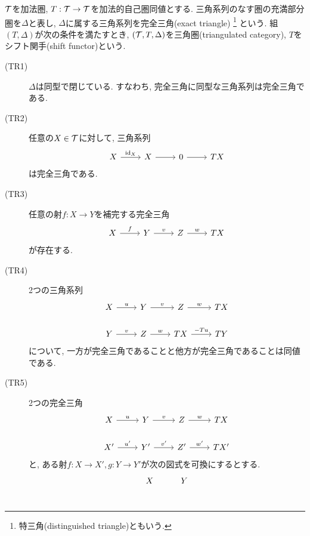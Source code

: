 \documentclass[uplatex, a4paper, 14Q, dvipdfmx]{jsarticle}
\begin{document}
\begin{definition}[三角圏]
  $\mathcal{T}$を加法圏, $T: \mathcal{T} \to \mathcal{T}$を加法的自己圏同値とする. 
  三角系列のなす圏の充満部分圏を$\Delta$と表し, $\Delta$に属する三角系列を完全三角(exact triangle)
  \footnote{
    特三角(distinguished triangle)ともいう. 
  }
  という. 
  組$(T,\Delta)$が次の条件を満たすとき, $(\mathcal{T}, T, \Delta)$を三角圏(triangulated category), $T$をシフト関手(shift functor)という. 
  \begin{description}
    \item[(TR1)] $\Delta$は同型で閉じている. すなわち, 完全三角に同型な三角系列は完全三角である. 
    \item[(TR2)] 任意の$X \in \mathcal{T}$に対して, 三角系列
    \[\begin{tikzcd}
      X & X & 0 & TX
      \arrow["\id_X", from=1-1, to=1-2]
      \arrow[from=1-2, to=1-3]
      \arrow[from=1-3, to=1-4]
    \end{tikzcd}\]
    は完全三角である. 
    \item[(TR3)] 任意の射$f: X \to Y$を補完する完全三角 
    \[\begin{tikzcd}
      X & Y & Z & TX
      \arrow["f", from=1-1, to=1-2]
      \arrow["v", from=1-2, to=1-3]
      \arrow["w", from=1-3, to=1-4]
    \end{tikzcd}\]
    が存在する. 
    \item[(TR4)] 2つの三角系列
    \[\begin{tikzcd}
      X & Y & Z & TX \\
      {Y} & {Z} & {TX} & {TY}
      \arrow["u", from=1-1, to=1-2]
      \arrow["v", from=1-2, to=1-3]
      \arrow["w", from=1-3, to=1-4]
      \arrow["{v}", from=2-1, to=2-2]
      \arrow["{w}", from=2-2, to=2-3]
      \arrow["{-Tu}", from=2-3, to=2-4]
    \end{tikzcd}\]
    について, 一方が完全三角であることと他方が完全三角であることは同値である. 
    \item[(TR5)] 2つの完全三角
    \[\begin{tikzcd}
      X & Y & Z & TX \\
      {X'} & {Y'} & {Z'} & {TX'}
      \arrow["u", from=1-1, to=1-2]
      \arrow["v", from=1-2, to=1-3]
      \arrow["w", from=1-3, to=1-4]
      \arrow["{u'}", from=2-1, to=2-2]
      \arrow["{v'}", from=2-2, to=2-3]
      \arrow["{w'}", from=2-3, to=2-4]
    \end{tikzcd}\]
    と, ある射$f: X \to X', g: Y \to Y'$が次の図式を可換にするとする. 
    \[\begin{tikzcd}
      X & Y \\

\end{tikzcd}\]
\end{description}
\end{definition}
\end{document}
